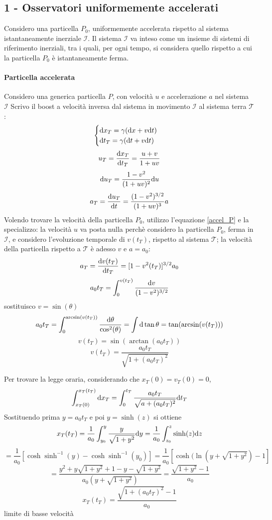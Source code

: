 \subsection{1 - Osservatori uniformemente accelerati}
Considero una particella $P_0$, uniformemente accelerata rispetto al sistema istantaneamente inerziale  $\mathcal{I}$.
Il sistema $\mathcal{I}$ va inteso come un insieme di sistemi di riferimento inerziali, tra i quali, per ogni tempo, si considera quello rispetto a cui la particella $P_0$ \`e istantaneamente ferma.
\paragraph{Particella accelerata}
Considero una generica particella $P$, con velocit\`a $u$ e accelerazione $a$ nel sistema $\mathcal{I}$
Scrivo il boost a velocit\`a inversa dal sistema in movimento $\mathcal{I}$ al sistema terra $\mathcal{T}$:
\begin{equation}
	\begin{cases}
		\mathrm{d} x_T = \gamma (\mathrm{d} x + v \mathrm{d} t) &  \\
		\mathrm{d} t_T = \gamma (\mathrm{d} t + v \mathrm{d} t) &  \\ 
	\end{cases}
\end{equation}
\[  u_T = \frac{\mathrm{d} x_T}{\mathrm{d} t_T} = \frac{u+v}{1+uv} \]
\[ \mathrm{d} u_T = \frac{1-v^2}{(1+uv)^2} \mathrm{d} u \]
\begin{equation} \label{accel_P}
	a_T = \frac{\mathrm{d} u_T}{\mathrm{d} t} = \frac{(1-v^2)^{3/2}}{(1+uv)^3} a 
\end{equation}
Volendo trovare la velocit\`a della particella $P_0$, utilizzo l'equazione \ref{accel_P} e la specializzo: la velocit\`a $u$ va posta nulla perch\`e considero la particella $P_0$, ferma in $\mathcal{I}$, e considero l'evoluzione temporale di $v(t_T)$, rispetto al sistema $\mathcal{T}$; la velocit\`a della particella rispetto a $\mathcal{T}$ \`e adesso $v$ e \( a = a_0 \):
\[ a_T = \frac{\mathrm{d} v(t_T)}{\mathrm{d} t_T} = [1-v^2(t_T)]^{3/2} a_0 \]
\[ a_0t_T = \int_0^{v(t_T)} \frac{\mathrm{d} v}{(1-v^2)^{3/2}} \]
sostituisco $v=\sin(\theta)$
\[ a_0t_T= \int_0^{\arcsin(v(t_T))} \frac{\mathrm{d} \theta}{\cos^2(\theta)} = \int \mathrm{d}\tan\theta = \tan(\arcsin(v(t_T))) \]
\[ v(t_T) = \sin(\arctan(a_0t_T)) \]
\begin{equation} \label{veloc}
		v(t_T) = \frac{a_0 t_T}{\sqrt{1+(a_0t_T)^2}} 
\end{equation}

Per trovare la legge oraria, considerando che \(x_T(0)=v_T(0)=0\),
\[ \int_{x_T(0)}^{x_T(t_T)} \mathrm{d} x_T = \int_0^{t_T} \frac{a_0t_T}{\sqrt{a+(a_0t_T)^2}} \mathrm{d} t_T \]
Sostituendo prima \( y=a_0t_T \) e poi \( y = \sinh(z) \) si ottiene
\[ x_T(t_T) = \frac{1}{a_0} \int_{y_0}^y \frac{y}{\sqrt{1+y^2}} \mathrm{d} y = \frac{1}{a_0} \int_{z_0}^z \sinh(z) \mathrm{d} z \]
\[ = \frac{1}{a_0} [\cosh\sinh^{-1}(y) - \cosh\sinh^{-1}(y_0)]  = \frac{1}{a_0} [\cosh(\ln(y + \sqrt{1+y^2}) -1]\]
\[ = \frac{y^2+y\sqrt{1+y^2}+1-y-\sqrt{1+y^2}}{a_0(y+\sqrt{1+y^2})}  = \frac{\sqrt{1+y^2}-1}{a_0} \]
\begin{equation} \label{leggeoraria}
	x_T(t_T) = \frac{\sqrt{1+(a_0t_T)^2}-1}{a_0} 
\end{equation}
\todo limite di basse velocit\`a

